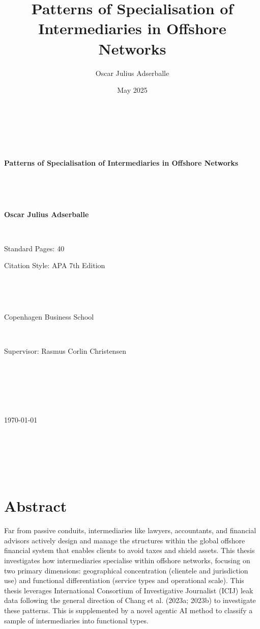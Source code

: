 \documentclass[12pt, a4paper]{report}
\title{Patterns of Specialisation of Intermediaries in Offshore Networks}
\author{Oscar Julius Adserballe}
\date{May 2025}
\begin{document}
\begin{titlepage}
    \centering
    \vspace*{1cm} 

    {\Huge\bfseries Patterns of Specialisation of Intermediaries in Offshore Networks\par}

    \vspace{1.5cm}

    {\Large\bfseries Oscar Julius Adserballe\par} 

    \vspace{1cm}

    {\large Standard Pages: 40\par} 
    {\large Citation Style: APA 7th Edition\par} 

    \vspace{1cm}

    {\large Copenhagen Business School\par} 
    {\large Supervisor: Rasmus Corlin Christensen\par} 

    \vspace{1cm}

    {\large \today\par} 

    \vfill 
\end{titlepage}

\pagestyle{plain}

\newpage
\tableofcontents 

\newpage
\listoffigures 

\newpage
\listoftables  

\newpage

\chapter*{Abstract}
\label{sec:abstract}
Far from passive conduits, intermediaries like lawyers, accountants, and financial advisors actively design and manage the structures within the global offshore financial system that enables clients to avoid taxes and shield assets. This thesis investigates how intermediaries specialise within offshore networks, focusing on two primary dimensions: geographical concentration (clientele and jurisdiction use) and functional differentiation (service types and operational scale). This thesis leverages International Consortium of Investigative Journalist (ICIJ) leak data following the general direction of Chang et al. (2023a; 2023b) to investigate these patterns. This is supplemented by a novel agentic AI method to classify a sample of intermediaries into functional types.
\end{document}
